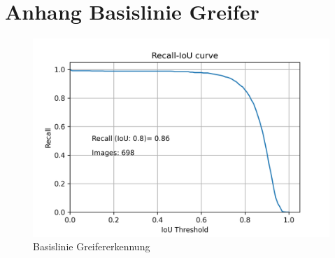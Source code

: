 \chapter{Anhang Basislinie Greifer}
\label{appendix:BasislinieGreifer}


\begin{figure}[h]
	\centering
	\includegraphics[width=1\textwidth, center]{bilder/Anhang/Baseline/Grapple/RecallIoU_Validation.png}
	\caption[RecallIoUGrappleBaseline]{Basislinie Greifererkennung}
	\label{img:RecallIoUGrappleBaseline}
\end{figure}	
